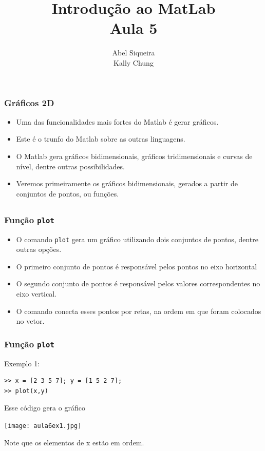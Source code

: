 \documentclass{beamer}
\title{Introdu\c{c}\~ao ao MatLab \\ Aula 5}
\author{Abel Siqueira \\ Kally Chung}
\date{}
\begin{document}
\frame{\titlepage}

\section[Gr\'aficos 2D]{}

\begin{frame}
\frametitle{Gr\'aficos 2D}

\begin{itemize}
 \item<1-> Uma das funcionalidades mais fortes do Matlab \'e gerar gr\'aficos.
 \item<2-> Este \'e o trunfo do Matlab sobre as outras linguagens.
 \item<3-> O Matlab gera gr\'aficos bidimensionais, gr\'aficos tridimensionais e curvas de n\'ivel, dentre outras possibilidades.
 \item<4-> Veremos primeiramente os gr\'aficos bidimensionais, gerados a partir de conjuntos de pontos, ou fun\c{c}\~oes.
\end{itemize}

\end{frame}
\subsection[Fun\c{c}\~ao plot]{}
\begin{frame}[fragile]
\frametitle{Fun\c{c}\~ao {\tt plot}}

\begin{itemize}
\item<1-> O comando {\tt plot} gera um gr\'afico utilizando dois conjuntos de
pontos, dentre outras op\c{c}\~oes.
\item<2-> O primeiro conjunto de pontos \'e respons\'avel pelos pontos no eixo
horizontal
\item<3-> O segundo conjunto de pontos \'e respons\'avel pelos valores
correspondentes no eixo vertical.
\item<4-> O comando conecta esses pontos por retas, na ordem em que foram
colocados no vetor.
\end{itemize}

\end{frame}

\begin{frame}[fragile]
\frametitle{Fun\c{c}\~ao {\tt plot}}

Exemplo 1:
{\scriptsize
\begin{verbatim}
>> x = [2 3 5 7]; y = [1 5 2 7];
>> plot(x,y)
\end{verbatim}}
\pause
Esse c\'odigo gera o gr\'afico
\begin{center}
\texttt{[image: aula6ex1.jpg]}
\end{center}
\pause
Note que os elementos de x est\~ao em ordem.
\end{frame}
\end{document}
